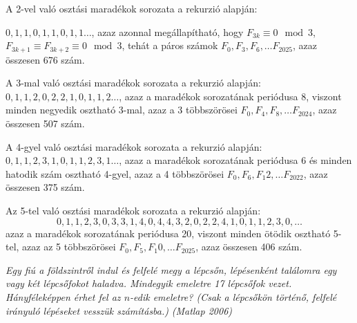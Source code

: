 \begin{solution}
A 2-vel való osztási maradékok sorozata a rekurzió alapján:

$0,1,1,0,1,1,0,1,1\dots$, azaz azonnal megállapítható, hogy $F_{3k}\equiv0\mod 3$,
$F_{3k+1}\equiv F_{3k+2}\equiv0\mod 3$, tehát a páros számok $F_{0},F_{3},F_{6},\dots F_{2025}$,
azaz összesen 676 szám.

A 3-mal való osztási maradékok sorozata a rekurzió alapján: $0,1,1,2,0,2,2,1,0,1,1,2\dots$,
azaz a maradékok sorozatának periódusa 8, viszont minden negyedik
osztható 3-mal, azaz a 3 többszörösei $F_{0},F_{4},F_{8},\dots F_{2024}$,
azaz összesen 507 szám.

A 4-gyel való osztási maradékok sorozata a rekurzió alapján: $0,1,1,2,3,1,0,1,1,2,3,1\dots$,
azaz a maradékok sorozatának periódusa 6 és minden hatodik szám osztható
4-gyel, azaz a 4 többszörösei $F_{0},F_{6},F_{1}2,\dots F_{2022}$,
azaz összesen 375 szám.

Az 5-tel való osztási maradékok sorozata a rekurzió alapján: 
\[
0,1,1,2,3,0,3,3,1,4,0,4,4,3,2,0,2,2,4,1,0,1,1,2,3,0,\dots
\]
 azaz a maradékok sorozatának periódusa 20, viszont minden ötödik
osztható 5-tel, azaz az 5 többszörösei $F_{0},F_{5},F_{1}0,\dots F_{2025}$,
azaz összesen 406 szám. 
\end{solution}
\begin{extraproblem}
\textit{\emph{Egy fiú a földszintről indul és felfelé megy a lépcsőn,
lépésenként találomra egy vagy két lépcsőfokot haladva. Mindegyik
emeletre 17 lépcsőfok vezet. Hányféleképpen érhet fel az $n$-edik
emeletre? (Csak a lépcsőkön történő, felfelé irányuló lépéseket vesszük
számításba.)}}\textit{ (Matlap 2006)}
\end{extraproblem}

